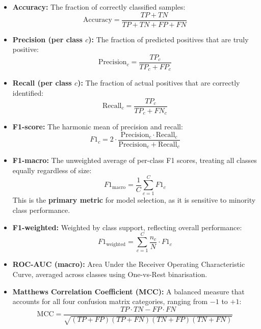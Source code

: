 \documentclass[12pt, a4paper]{article}
\begin{document}
\begin{itemize}[nosep]
    \item \textbf{Accuracy:} The fraction of correctly classified samples:
    \begin{equation}
        \text{Accuracy} = \frac{TP + TN}{TP + TN + FP + FN}
    \end{equation}

    \item \textbf{Precision (per class $c$):} The fraction of predicted positives that are truly positive:
    \begin{equation}
        \text{Precision}_c = \frac{TP_c}{TP_c + FP_c}
    \end{equation}

    \item \textbf{Recall (per class $c$):} The fraction of actual positives that are correctly identified:
    \begin{equation}
        \text{Recall}_c = \frac{TP_c}{TP_c + FN_c}
    \end{equation}

    \item \textbf{F1-score:} The harmonic mean of precision and recall:
    \begin{equation}
        F1_c = 2 \cdot \frac{\text{Precision}_c \cdot \text{Recall}_c}{\text{Precision}_c + \text{Recall}_c}
    \end{equation}

    \item \textbf{F1-macro:} The unweighted average of per-class F1 scores, treating all classes equally regardless of size:
    \begin{equation}
        F1_{\text{macro}} = \frac{1}{C} \sum_{c=1}^{C} F1_c
    \end{equation}
    This is the \textbf{primary metric} for model selection, as it is sensitive to minority class performance.

    \item \textbf{F1-weighted:} Weighted by class support, reflecting overall performance:
    \begin{equation}
        F1_{\text{weighted}} = \sum_{c=1}^{C} \frac{n_c}{N} \cdot F1_c
    \end{equation}

    \item \textbf{ROC-AUC (macro):} Area Under the Receiver Operating Characteristic Curve, averaged across classes using One-vs-Rest binarisation.

    \item \textbf{Matthews Correlation Coefficient (MCC):} A balanced measure that accounts for all four confusion matrix categories, ranging from $-1$ to $+1$:
    \begin{equation}
        \text{MCC} = \frac{TP \cdot TN - FP \cdot FN}{\sqrt{(TP+FP)(TP+FN)(TN+FP)(TN+FN)}}
    \end{equation}
\end{itemize}
\end{document}
